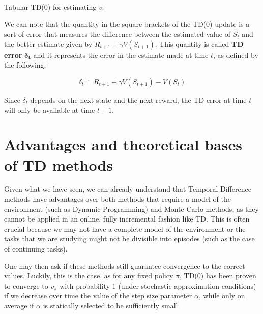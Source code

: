 \begin{algorithm}[H]
\DontPrintSemicolon
\SetAlgoVlined
{}
\Parameters{step size $\alpha \in \left] 0,1 \right]$}

\caption{Tabular TD(0) for estimating $v_\pi$}
\end{algorithm}

We can note that the quantity in the square brackets of the TD(0) update is a sort of error that measures the difference between the estimated value of $S_t$ and the better estimate given by $R_{t+1} + \gamma V(S_{t+1})$. This quantity is called \textbf{TD error} $\boldsymbol{\delta_t}$ and it represents the error in the estimate made at time $t$, as defined by the following:

\begin{equation}
    \delta_t \doteq R_{t+1} + \gamma V(S_{t+1}) - V(S_t)
    \label{eq:ch5-tderrordeltat}
\end{equation}

Since $\delta_t$ depends on the next state and the next reward, the TD error at time $t$ will only be available at time $t+1$.

\section{Advantages and theoretical bases of TD methods}
Given what we have seen, we can already understand that Temporal Difference methods have advantages over both methods that require a model of the environment (such as Dynamic Programming) and Monte Carlo methods, as they cannot be applied in an online, fully incremental fashion like TD. This is often crucial because we may not have a complete model of the environment or the tasks that we are studying might not be divisible into episodes (such as the case of continuing tasks).

One may then ask if these methods still guarantee convergence to the correct values. Luckily, this is the case, as for any fixed policy $\pi$, TD(0) has been proven to converge to $v_\pi$ with probability 1 (under stochastic approximation conditions) if we decrease over time the value of the step size parameter $\alpha$, while only on average if $\alpha$ is statically selected to be sufficiently small.

